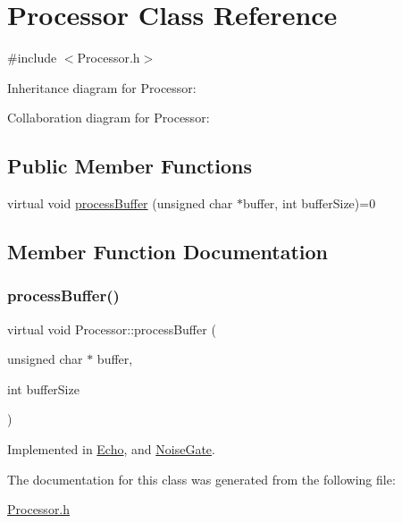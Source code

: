 \hypertarget{classProcessor}{}\section{Processor Class Reference}
\label{classProcessor}


{\ttfamily \#include $<$Processor.\+h$>$}



Inheritance diagram for Processor\+:


Collaboration diagram for Processor\+:
\subsection*{Public Member Functions}
\begin{DoxyCompactItemize}
\item 
virtual void \hyperlink{classProcessor_a401e57b59e43de9c4a51ca0f566d2948}{process\+Buffer} (unsigned char $\ast$buffer, int buffer\+Size)=0
\end{DoxyCompactItemize}


\subsection{Member Function Documentation}
\mbox{\label{classProcessor_a401e57b59e43de9c4a51ca0f566d2948}} 
\subsubsection{\texorpdfstring{process\+Buffer()}{processBuffer()}}
{\footnotesize\ttfamily virtual void Processor\+::process\+Buffer (\begin{DoxyParamCaption}\item[{unsigned char $\ast$}]{buffer,  }\item[{int}]{buffer\+Size }\end{DoxyParamCaption})\hspace{0.3cm}{\ttfamily [pure virtual]}}



Implemented in \hyperlink{classEcho_ae915d9d4065a34411d18791a5ae9006b}{Echo}, and \hyperlink{classNoiseGate_a319f4b7d435ed4a270e695cf7c529d24}{Noise\+Gate}.



The documentation for this class was generated from the following file\+:\begin{DoxyCompactItemize}
\item 
\hyperlink{Processor_8h}{Processor.\+h}\end{DoxyCompactItemize}
